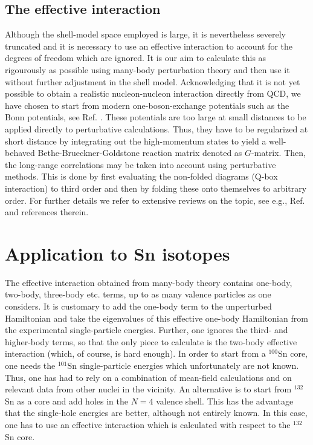 \subsection{The effective interaction}
Although the shell-model space employed is large, it is 
nevertheless severely truncated and it is necessary to use an 
effective interaction to account for the degrees of freedom 
which are ignored. It is our aim to calculate this as rigourously 
as possible using many-body perturbation theory and then use it 
without further adjustment in the shell model. Acknowledging 
that it is not yet possible to obtain a realistic 
nucleon-nucleon interaction directly from QCD, we have chosen 
to start from modern one-boson-exchange potentials such as the 
Bonn potentials, see Ref. \cite{cdbonn}. These potentials are too large at small distances 
to be applied directly to perturbative calculations. Thus, they have 
to be regularized at short distance by integrating out the 
high-momentum states to yield a well-behaved Bethe-Brueckner-Goldstone 
reaction matrix denoted as $G$-matrix. Then, the long-range 
correlations may be taken into account using perturbative methods. 
This is done by first evaluating the non-folded diagrams 
(Q-box interaction) to third order and then by folding these 
onto themselves to arbitrary order. For further details we 
refer to extensive reviews on the topic, see e.g.,  Ref. \cite{hko95}
and references therein.

\section{Application to Sn isotopes}
The effective interaction obtained from many-body theory 
contains one-body, two-body, three-body etc. terms, up to as 
many valence particles as one considers. It is customary to add 
the one-body term to the unperturbed Hamiltonian and take the 
eigenvalues of this effective one-body Hamiltonian from the 
experimental single-particle energies. Further, one ignores the 
third- and higher-body terms, so that the only piece to calculate 
is the two-body effective interaction (which, of course, is hard enough). 
In order to start from a $^{100}$Sn core, one needs the 
$^{101}$Sn single-particle 
energies which unfortunately are not known. Thus, one has had to rely 
on a combination of mean-field calculations and on relevant data 
from other nuclei in the vicinity. An alternative is to start from $^{132}$Sn 
as a core and add holes in the $N = 4$ valence shell. This has the 
advantage that the single-hole energies are better, although not 
entirely known. In this case, one has to use an effective 
interaction which is calculated with respect to the $^{132}$Sn core. 

